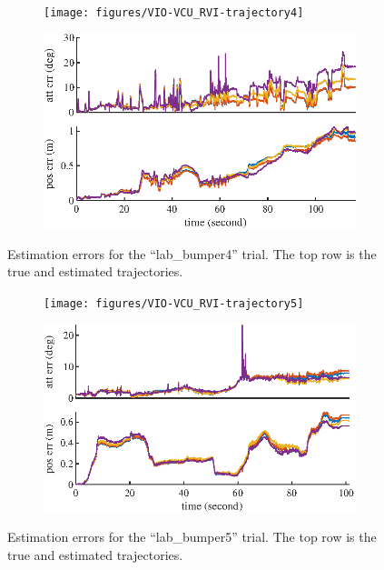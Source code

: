 \begin{figure}
	\centering
	\begin{subfigure}{\textwidth}
		\centering
		\texttt{[image: figures/VIO-VCU\_RVI-trajectory4]}
	\end{subfigure}
	\begin{subfigure}{\textwidth}
		\centering
		\vspace{1cm}
		\includegraphics[scale=1.3]{figures/VIO-VCU_RVI-error4}
	\end{subfigure}
	\caption{Estimation errors for the ``lab\_bumper4'' trial. The top row is the true and estimated trajectories.}
	\label{fig:VIO-dataset4}
\end{figure}

\begin{figure}
	\centering
	\begin{subfigure}{\textwidth}
		\centering
		\texttt{[image: figures/VIO-VCU\_RVI-trajectory5]}
	\end{subfigure}
	\begin{subfigure}{\textwidth}
		\centering
		\vspace{1cm}
		\includegraphics[scale=1.3]{figures/VIO-VCU_RVI-error5}
	\end{subfigure}
	\caption{Estimation errors for the ``lab\_bumper5'' trial. The top row is the true and estimated trajectories.}
	\label{fig:VIO-dataset5}
\end{figure}
